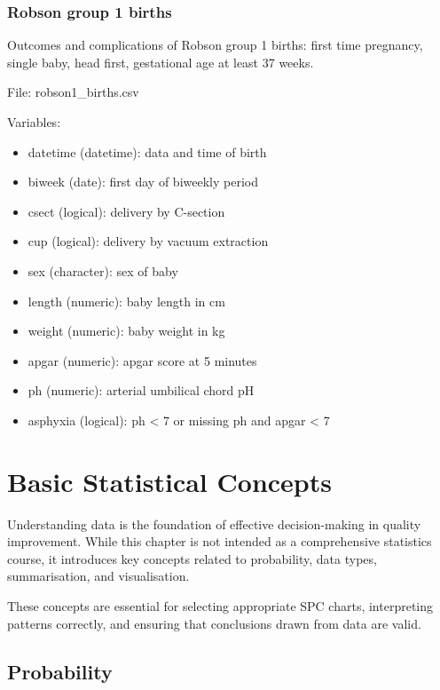 \documentclass[
]{book}
\providecommand{\tightlist}{%
  \setlength{\itemsep}{0pt}\setlength{\parskip}{0pt}}
\begin{document}
\subsection*{Robson group 1 births}\label{robson-group-1-births}

Outcomes and complications of Robson group 1 births: first time
pregnancy, single baby, head first, gestational age at least 37 weeks.

File: robson1\_births.csv

Variables:

\begin{itemize}
\tightlist
\item
  datetime (datetime): data and time of birth
\item
  biweek (date): first day of biweekly period
\item
  csect (logical): delivery by C-section
\item
  cup (logical): delivery by vacuum extraction
\item
  sex (character): sex of baby
\item
  length (numeric): baby length in cm
\item
  weight (numeric): baby weight in kg
\item
  apgar (numeric): apgar score at 5 minutes
\item
  ph (numeric): arterial umbilical chord pH
\item
  asphyxia (logical): ph \textless{} 7 or missing ph and apgar \textless{} 7
\end{itemize}

\chapter{Basic Statistical Concepts}\label{stat-concepts}

Understanding data is the foundation of effective decision-making in quality improvement. While this chapter is not intended as a comprehensive statistics course, it introduces key concepts related to probability, data types, summarisation, and visualisation.

These concepts are essential for selecting appropriate SPC charts, interpreting patterns correctly, and ensuring that conclusions drawn from data are valid.

\section{Probability}\label{probability}
\end{document}
